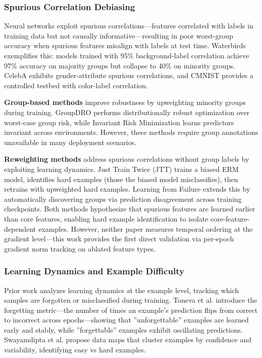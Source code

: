 
\subsubsection{Spurious Correlation Debiasing}

Neural networks exploit spurious correlations---features correlated with labels in training data but not causally informative---resulting in poor worst-group accuracy when spurious features misalign with labels at test time. Waterbirds exemplifies this: models trained with 95\% background-label correlation achieve 97\% accuracy on majority groups but collapse to 40\% on minority groups. CelebA exhibits gender-attribute spurious correlations, and CMNIST provides a controlled testbed with color-label correlation.

\textbf{Group-based methods} improve robustness by upweighting minority groups during training. GroupDRO performs distributionally robust optimization over worst-case group risk, while Invariant Risk Minimization learns predictors invariant across environments. However, these methods require group annotations unavailable in many deployment scenarios.

\textbf{Reweighting methods} address spurious correlations without group labels by exploiting learning dynamics. Just Train Twice (JTT) trains a biased ERM model, identifies hard examples (those the biased model misclassifies), then retrains with upweighted hard examples. Learning from Failure extends this by automatically discovering groups via prediction disagreement across training checkpoints. Both methods hypothesize that spurious features are learned earlier than core features, enabling hard example identification to isolate core-feature-dependent examples. However, neither paper measures temporal ordering at the gradient level---this work provides the first direct validation via per-epoch gradient norm tracking on ablated feature types.

\subsubsection{Learning Dynamics and Example Difficulty}

Prior work analyzes learning dynamics at the example level, tracking which samples are forgotten or misclassified during training. Toneva et al. introduce the forgetting metric---the number of times an example's prediction flips from correct to incorrect across epochs---showing that ''unforgettable'' examples are learned early and stably, while ''forgettable'' examples exhibit oscillating predictions. Swayamdipta et al. propose data maps that cluster examples by confidence and variability, identifying easy vs hard examples.

